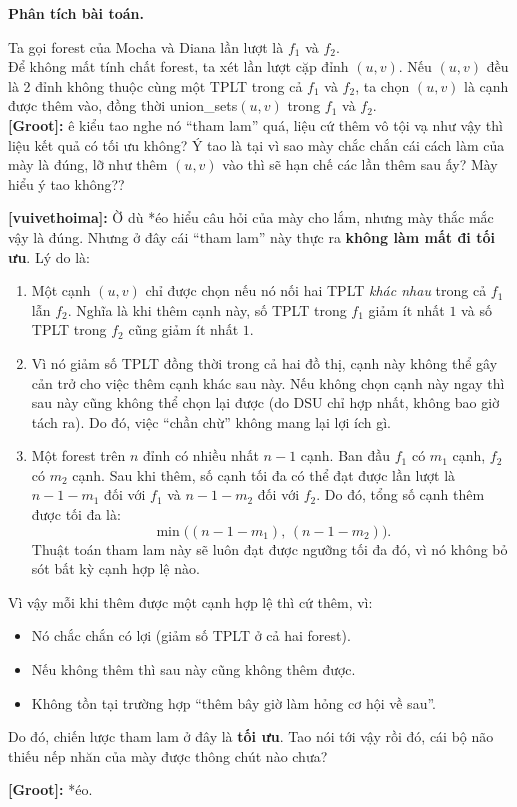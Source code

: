 \textbf{Phân tích bài toán.}

Ta gọi forest của Mocha và Diana lần lượt là $f_1$ và $f_2$.\\

Để không mất tính chất forest, ta xét lần lượt cặp đỉnh $(u, v)$. Nếu $(u, v)$ đều là 2 đỉnh không thuộc cùng một TPLT trong cả $f_1$ và $f_2$, ta chọn $(u, v)$ là cạnh được thêm vào, đồng thời union\_sets$(u, v)$ trong $f_1$ và $f_2$.\\

\textbf{[Groot]:} ê kiểu tao nghe nó ``tham lam'' quá, liệu cứ thêm vô tội vạ như vậy thì liệu kết quả có tối ưu không? Ý tao là tại vì sao mày chắc chắn cái cách làm của mày là đúng, lỡ như thêm $(u,v)$ vào thì sẽ hạn chế các lần thêm sau ấy? Mày hiểu ý tao không??

\textbf{[vuivethoima]:} Ờ dù *éo hiểu câu hỏi của mày cho lắm, nhưng mày thắc mắc vậy là đúng. Nhưng ở đây cái ``tham lam'' này thực ra \textbf{không làm mất đi tối ưu}. Lý do là:

\begin{enumerate}
    \item Một cạnh $(u,v)$ chỉ được chọn nếu nó nối hai TPLT \emph{khác nhau} trong cả $f_1$ lẫn $f_2$.  
    Nghĩa là khi thêm cạnh này, số TPLT trong $f_1$ giảm ít nhất $1$ và số TPLT trong $f_2$ cũng giảm ít nhất $1$.

    \item Vì nó giảm số TPLT đồng thời trong cả hai đồ thị, cạnh này không thể gây cản trở cho việc thêm cạnh khác sau này.  
    Nếu không chọn cạnh này ngay thì sau này cũng không thể chọn lại được (do DSU chỉ hợp nhất, không bao giờ tách ra).  
    Do đó, việc ``chần chừ'' không mang lại lợi ích gì.

    \item Một forest trên $n$ đỉnh có nhiều nhất $n-1$ cạnh.  
    Ban đầu $f_1$ có $m_1$ cạnh, $f_2$ có $m_2$ cạnh.  
    Sau khi thêm, số cạnh tối đa có thể đạt được lần lượt là $n-1-m_1$ đối với $f_1$ và $n-1-m_2$ đối với $f_2$.  
    Do đó, tổng số cạnh thêm được tối đa là:
    \[
        \min\bigl((n-1-m_1),\,(n-1-m_2)\bigr).
    \]
    Thuật toán tham lam này sẽ luôn đạt được ngưỡng tối đa đó, vì nó không bỏ sót bất kỳ cạnh hợp lệ nào.
\end{enumerate}

\noindent
Vì vậy mỗi khi thêm được một cạnh hợp lệ thì cứ thêm, vì:
\begin{itemize}
    \item Nó chắc chắn có lợi (giảm số TPLT ở cả hai forest).
    \item Nếu không thêm thì sau này cũng không thêm được.
    \item Không tồn tại trường hợp ``thêm bây giờ làm hỏng cơ hội về sau''.
\end{itemize}

Do đó, chiến lược tham lam ở đây là \textbf{tối ưu}. Tao nói tới vậy rồi đó, cái bộ não thiếu nếp nhăn của mày được thông chút nào chưa?

\textbf{[Groot]:} *éo.
 